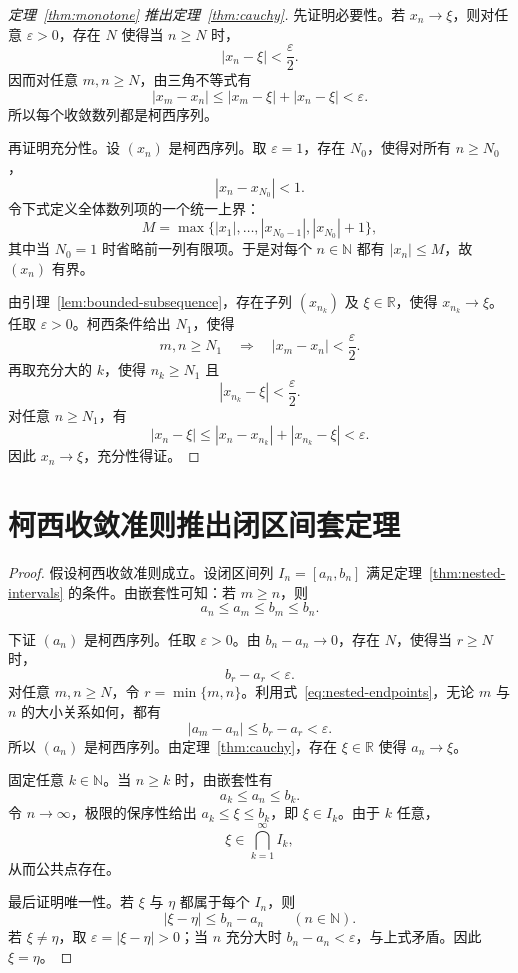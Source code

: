 \documentclass[UTF8,12pt,a4paper,fontset=fandol,oneside]{ctexart}
\begin{document}
\begin{proof}[定理~\ref{thm:monotone} 推出定理~\ref{thm:cauchy}]
  先证明必要性。若 $x_n\to\xi$，则对任意 $\varepsilon>0$，存在 $N$ 使得当 $n\geq N$ 时，
  \[
    |x_n-\xi|<\frac{\varepsilon}{2}.
  \]
  因而对任意 $m,n\geq N$，由三角不等式有
  \[
    |x_m-x_n|
    \leq |x_m-\xi|+|x_n-\xi|
    <\varepsilon.
  \]
  所以每个收敛数列都是柯西序列。

  再证明充分性。设 $(x_n)$ 是柯西序列。取 $\varepsilon=1$，存在 $N_0$，使得对所有 $n\geq N_0$，
  \[
    |x_n-x_{N_0}|<1.
  \]
  令下式定义全体数列项的一个统一上界：
  \nopagebreak[4]
  \[
    M=\max\bigl\{|x_1|,\ldots,|x_{N_0-1}|,|x_{N_0}|+1\bigr\},
  \]
  其中当 $N_0=1$ 时省略前一列有限项。于是对每个 $n\in\mathbb N$ 都有 $|x_n|\leq M$，故 $(x_n)$ 有界。

  由引理~\ref{lem:bounded-subsequence}，存在子列 $(x_{n_k})$ 及 $\xi\in\mathbb R$，使得 $x_{n_k}\to\xi$。任取 $\varepsilon>0$。柯西条件给出 $N_1$，使得
  \[
    m,n\geq N_1\quad\Longrightarrow\quad
    |x_m-x_n|<\frac{\varepsilon}{2}.
  \]
  再取充分大的 $k$，使得 $n_k\geq N_1$ 且
  \[
    |x_{n_k}-\xi|<\frac{\varepsilon}{2}.
  \]
  对任意 $n\geq N_1$，有
  \[
    |x_n-\xi|
    \leq |x_n-x_{n_k}|+|x_{n_k}-\xi|
    <\varepsilon.
  \]
  因此 $x_n\to\xi$，充分性得证。
\end{proof}

\section{柯西收敛准则推出闭区间套定理}

\begin{proof}
  假设柯西收敛准则成立。设闭区间列 $I_n=[a_n,b_n]$ 满足定理~\ref{thm:nested-intervals} 的条件。由嵌套性可知：若 $m\geq n$，则
  \begin{equation}
    a_n\leq a_m\leq b_m\leq b_n.
    \label{eq:nested-endpoints}
  \end{equation}

  下证 $(a_n)$ 是柯西序列。任取 $\varepsilon>0$。由 $b_n-a_n\to0$，存在 $N$，使得当 $r\geq N$ 时，
  \[
    b_r-a_r<\varepsilon.
  \]
  对任意 $m,n\geq N$，令 $r=\min\{m,n\}$。利用式~\eqref{eq:nested-endpoints}，无论 $m$ 与 $n$ 的大小关系如何，都有
  \[
    |a_m-a_n|\leq b_r-a_r<\varepsilon.
  \]
  所以 $(a_n)$ 是柯西序列。由定理~\ref{thm:cauchy}，存在 $\xi\in\mathbb R$ 使得 $a_n\to\xi$。

  固定任意 $k\in\mathbb N$。当 $n\geq k$ 时，由嵌套性有
  \[
    a_k\leq a_n\leq b_k.
  \]
  令 $n\to\infty$，极限的保序性给出 $a_k\leq\xi\leq b_k$，即 $\xi\in I_k$。由于 $k$ 任意，
  \[
    \xi\in\bigcap_{k=1}^{\infty}I_k,
  \]
  从而公共点存在。

  最后证明唯一性。若 $\xi$ 与 $\eta$ 都属于每个 $I_n$，则
  \[
    |\xi-\eta|\leq b_n-a_n\qquad(n\in\mathbb N).
  \]
  若 $\xi\ne\eta$，取 $\varepsilon=|\xi-\eta|>0$；当 $n$ 充分大时 $b_n-a_n<\varepsilon$，与上式矛盾。因此 $\xi=\eta$。
\end{proof}
\end{document}
